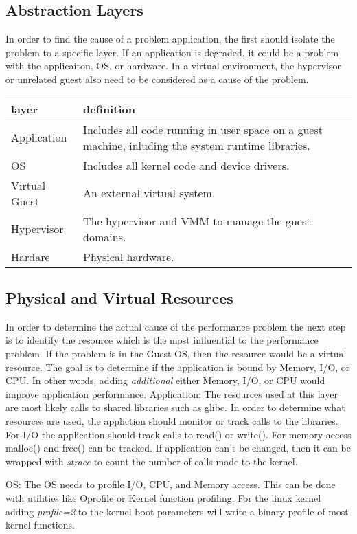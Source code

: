 \subsection{Abstraction Layers}
In order to find the cause of a problem application, the first should isolate the problem to a specific layer.  If an application is degraded, it could be a problem with the applicaiton, OS, or hardware.  In a virtual environment, the hypervisor or unrelated guest also need to be considered as a cause of the problem.  
\newline
\begin{tabular}{ l p{5cm} }
  layer & definition \\
  \hline
  Application & Includes all code running in user space on a guest machine, inluding the system runtime libraries. \\
  OS & Includes all kernel code and device drivers. \\
  Virtual Guest & An external virtual system. \\
  Hypervisor & The hypervisor and VMM to manage the guest domains. \\
  Hardare & Physical hardware. \\
\end{tabular}

\subsection{Physical and Virtual Resources}
In order to determine the actual cause of the performance problem the next step is to identify the resource which is the most influential to the performance problem.  If the problem is in the Guest OS, then the resource would be a virtual resource.  The goal is to determine if the application is bound by Memory, I/O, or CPU.  In other words, adding \emph{additional} either Memory, I/O, or CPU would improve application performance.  
\newline
Application:  The resources used at this layer are most likely calls to shared libraries such as glibc.  In order to determine what resources are used, the appliction should monitor or track calls to the libraries.  For I/O the application should track calls to read() or write().  For memory access malloc() and free() can be tracked.  If application can't be changed, then it can be wrapped with \emph{strace} to count the number of calls made to the kernel.

OS:  The OS needs to profile I/O, CPU, and Memory access.  This can be done with utilities like Oprofile or Kernel function profiling.  For the linux kernel adding \emph{profile=2} to the kernel boot parameters will write a binary profile of most kernel functions.  

